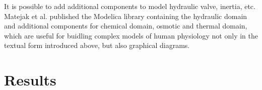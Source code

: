 \documentclass[letterpaper, 10 pt, conference]{ieeeconf}  %
\begin{document}
It is possible to add additional components to model hydraulic valve, inertia, etc. Matejak et al. published the Modelica library containing the hydraulic domain and additional components for chemical domain, osmotic and thermal domain, which are useful for buidling complex models of human physiology not only in the textual form introduced above, but also graphical diagrams\cite{Matejak2014,Matejak2014mj}.  


%
%

\addtolength{\textheight}{-12cm}   %


\section{Results}
\end{document}
